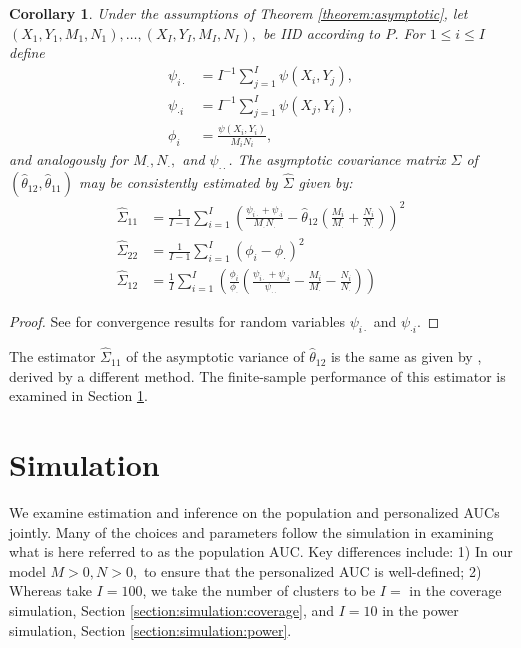 \documentclass[12pt]{article}
\DeclareMathOperator{\AUC}{AUC}
\newcommand{\I}{I}
\renewcommand{\P}{P}
\newcommand{\cind}{\perp \!\!\! \perp}
\newcommand{\aucindivhat}{\hat{\theta}_{11}}%
\newcommand{\aucpophat}{\hat{\theta}_{12}}%
\newcommand{\kernel}{\psi}
\newcommand{\Kernel}{\psi}
\renewcommand{\d}{\phi}
\newtheorem{corollary}[theorem]{Corollary}
\begin{document}
\begin{corollary}\label{corollary:variance estimator}
  Under the assumptions of Theorem \ref{theorem:asymptotic}, let
  $(X_1,Y_1,M_1,N_1),\ldots,(X_\I,Y_\I,M_\I,N_\I),$ be IID according
  to $\P$. For $1\le i\le \I$ define
  \begin{align}
    \kernel_{i\cdot}&=I^{-1}\sum_{j=1}^\I \kernel(X_i,Y_j),\\
    \kernel_{\cdot i}&=I^{-1}\sum_{j=1}^\I \kernel(X_j,Y_i),\\
    \phi_i &= \frac{\kernel(X_i,Y_i)}{M_iN_i},
  \end{align}
  and analogously for $M_\cdot,N_\cdot,$ and $\kernel_{\cdot\cdot}$. The asymptotic covariance matrix
  $\Sigma$ of $(\aucpophat,\aucindivhat)$ may be consistently
  estimated by $\hat{\Sigma}$ given by:
  \begin{align}
    \hat{\Sigma}_{11} &=\frac{1}{\I-1}\sum_{i=1}^\I\left( \frac{\Kernel_{i\cdot}+\Kernel_{\cdot i}}{M_\cdot N_\cdot}-\aucpophat\left(\frac{M_i}{M_\cdot}+\frac{N_i}{N_\cdot}\right) \right)^2\\
    \hat{\Sigma}_{22} &= \frac{1}{\I-1}\sum_{i=1}^\I(\d_i-\d_\cdot)^2\\
    \hat{\Sigma}_{12} &=\frac{1}{\I}\sum_{i=1}^\I\left(\frac{\d_{i}}{\d_{\cdot}}\left(\frac{\Kernel_{i\cdot}+\Kernel_{\cdot i}}{\Kernel_{\cdot\cdot}} - \frac{M_i}{M_\cdot}-\frac{N_i}{N_\cdot}   \right) \right) %
  \end{align}
\end{corollary}
\begin{proof}
  See \cite{sen1960} for convergence results for random variables $\Kernel_{i\cdot}$ and $\Kernel_{\cdot i}.$
\end{proof}
The estimator $\hat{\Sigma}_{11}$ of the asymptotic variance of $\aucpophat$ is the same as given by \cite{obuchowski1997}, derived by a different method. The finite-sample performance of this estimator is examined in Section \ref{section:simulation}.



\section{Simulation}\label{section:simulation}

We examine estimation and inference on the population and personalized
AUCs jointly. Many of the choices and parameters follow the simulation
in \cite{obuchowski1997} examining what is here referred to as the
population AUC. Key differences include: 1) In our model
$M>0,N>0,$ to ensure that the personalized AUC is well-defined; 2) Whereas
\cite{obuchowski1997} take $\I=100$, we take the number of clusters to be $\I=$ in the coverage simulation, Section \ref{section:simulation:coverage}, and $\I=10$ in the power simulation, Section \ref{section:simulation:power}.
\end{document}

